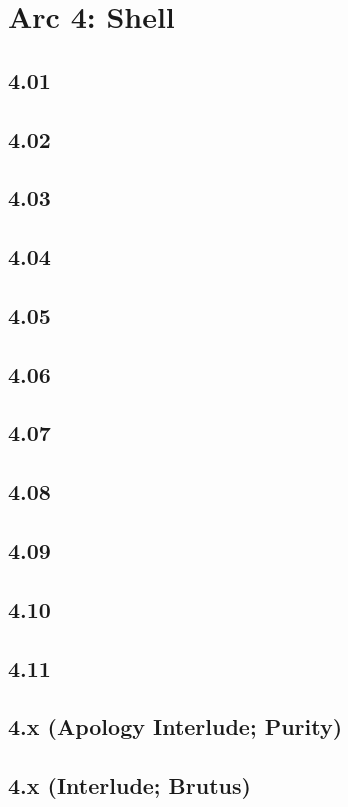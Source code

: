 \part{Arc 4: Shell}
 \chapter{4.01}
 \chapter{4.02}
 \chapter{4.03}
 \chapter{4.04}
 \chapter{4.05}
 \chapter{4.06}
 \chapter{4.07}
 \chapter{4.08}
 \chapter{4.09}
 \chapter{4.10}
 \chapter{4.11}
 \chapter{4.x (Apology Interlude; Purity)}
 \chapter{4.x (Interlude; Brutus)}














